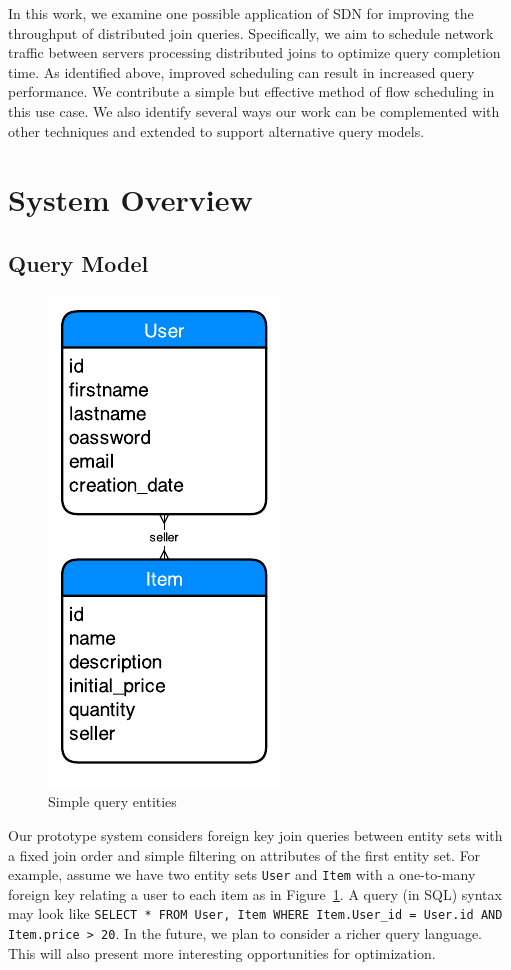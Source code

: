 \documentclass{acm_proc_article-sp}
\begin{document}
In this work, we examine one possible application of SDN for improving the throughput of distributed join queries.
Specifically, we aim to schedule network traffic between servers processing distributed joins to optimize query completion time.
As identified above, improved scheduling can result in increased query performance.
We contribute a simple but effective method of flow scheduling in this use case.
We also identify several ways our work can be complemented with other techniques and extended to support alternative query models.

\section{System Overview}

\subsection{Query Model}

\begin{figure}
    \centering
    \includegraphics{figures/rubis-er.pdf}
    \caption{Simple query entities}\label{fig:entities}
\end{figure}

Our prototype system considers foreign key join queries between entity sets with a fixed join order and simple filtering on attributes of the first entity set.
For example, assume we have two entity sets \texttt{User} and \texttt{Item} with a one-to-many foreign key relating a user to each item as in Figure~\ref{fig:entities}.
A query (in SQL) syntax may look like \texttt{SELECT * FROM User, Item WHERE Item.User\_id = User.id AND Item.price > 20}.
In the future, we plan to consider a richer query language.
This will also present more interesting opportunities for optimization.
\end{document}
